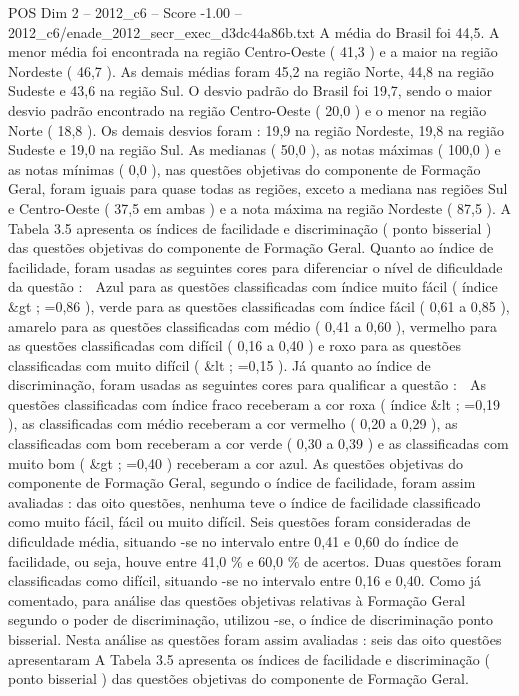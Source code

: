 \begin{textsample}{POS Dim 2 – 2012\_c6 – Score -1.00 – 2012\_c6/enade\_2012\_secr\_exec\_d3dc44a86b.txt}
A média do Brasil foi 44,5.
A menor média foi encontrada na região Centro-Oeste ( 41,3 ) e a maior na região Nordeste ( 46,7 ).
As demais médias foram 45,2 na região Norte, 44,8 na região Sudeste e 43,6 na região Sul.
O desvio padrão do Brasil foi 19,7, sendo o maior desvio padrão encontrado na região Centro-Oeste ( 20,0 ) e o menor na região Norte ( 18,8 ).
Os demais desvios foram : 19,9 na região Nordeste, 19,8 na região Sudeste e 19,0 na região Sul.
As medianas ( 50,0 ), as notas máximas ( 100,0 ) e as notas mínimas ( 0,0 ), nas questões objetivas do componente de Formação Geral, foram iguais para quase todas as regiões, exceto a mediana nas regiões Sul e Centro-Oeste ( 37,5 em ambas ) e a nota máxima na região Nordeste ( 87,5 ).
A Tabela 3.5 apresenta os índices de facilidade e discriminação ( ponto bisserial ) das questões objetivas do componente de Formação Geral.
Quanto ao índice de facilidade, foram usadas as seguintes cores para diferenciar o nível de dificuldade da questão :  Azul para as questões classificadas com índice muito fácil ( índice \&gt ; =0,86 ), verde para as questões classificadas com índice fácil ( 0,61 a 0,85 ), amarelo para as questões classificadas com médio ( 0,41 a 0,60 ), vermelho para as questões classificadas com difícil ( 0,16 a 0,40 ) e roxo para as questões classificadas com muito difícil ( \&lt ; =0,15 ).
Já quanto ao índice de discriminação, foram usadas as seguintes cores para qualificar a questão :  As questões classificadas com índice fraco receberam a cor roxa ( índice \&lt ; =0,19 ), as classificadas com médio receberam a cor vermelho ( 0,20 a 0,29 ), as classificadas com bom receberam a cor verde ( 0,30 a 0,39 ) e as classificadas com muito bom ( \&gt ; =0,40 ) receberam a cor azul.
As questões objetivas do componente de Formação Geral, segundo o índice de facilidade, foram assim avaliadas : das oito questões, nenhuma teve o índice de facilidade classificado como muito fácil, fácil ou muito difícil.
Seis questões foram consideradas de dificuldade média, situando -se no intervalo entre 0,41 e 0,60 do índice de facilidade, ou seja, houve entre 41,0 \% e 60,0 \% de acertos.
Duas questões foram classificadas como difícil, situando -se no intervalo entre 0,16 e 0,40.
Como já comentado, para análise das questões objetivas relativas à Formação Geral segundo o poder de discriminação, utilizou -se, o índice de discriminação ponto bisserial.
Nesta análise as questões foram assim avaliadas : seis das oito questões apresentaram A Tabela 3.5 apresenta os índices de facilidade e discriminação ( ponto bisserial ) das questões objetivas do componente de Formação Geral.

\end{textsample}
